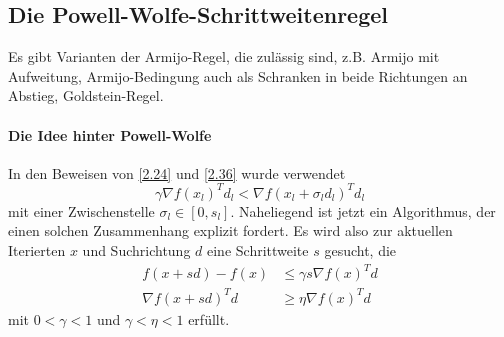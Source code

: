 \subsection{Die Powell-Wolfe-Schrittweitenregel}

Es gibt Varianten der Armijo-Regel, die zulässig sind, z.B. Armijo mit Aufweitung, Armijo-Bedingung auch als Schranken in beide Richtungen an Abstieg, Goldstein-Regel.

\paragraph{Die Idee hinter Powell-Wolfe}
In den Beweisen von \ref{2.24} und \ref{2.36} wurde verwendet
\[
	\gamma \nabla f(x_l)^T d_l
	< \nabla f(x_l + \sigma_l d_l)^T d_l
\]
mit einer Zwischenstelle $\sigma_l \in [0, s_l]$.
Naheliegend ist jetzt ein Algorithmus, der einen solchen Zusammenhang explizit fordert.
Es wird also zur aktuellen Iterierten $x$ und Suchrichtung $d$ eine Schrittweite $s$ gesucht, die
\begin{align}
	f(x+sd) - f(x)
	&\le \gamma s \nabla f(x)^T d \label{eq:pw1}\\
	\nabla f(x+sd)^T d
	&\ge \eta \nabla f(x)^T d \label{eq:pw2}
\end{align}
mit $0 < \gamma < 1$ und $\gamma < \eta < 1$ erfüllt.

\begin{alg} \label{alg:4}
	\begin{algorithmic}
		\Repeat
		\Repeat
		\Else
		\EndIf
		\EndWhile
	\end{algorithmic}
\end{alg}


